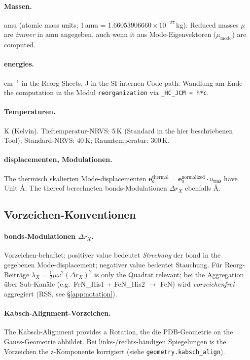 \documentclass[11pt,a4paper,twoside]{article}
\providecommand{\angstrom}{\text{\AA}}    %
\theoremstyle{remark}
\begin{document}
\paragraph{Massen.}
amu (atomic mass units; 1\,amu = $1.66053906660 \times 10^{-27}$\,kg).
Reduced masses $\mu$ are \emph{immer} in amu angegeben, auch
wenn it aus Mode-Eigenvektoren ($\mu_\text{mode}$) are computed.

\paragraph{energies.}
cm$^{-1}$ in the Reorg-Sheets, J in the SI-internen Code-path. Wandlung
am Ende the computation in the Modul \texttt{reorganization} via
\verb|_HC_JCM = h*c|.

\paragraph{Temperaturen.}
K (Kelvin). Tieftemperatur-NRVS: 5\,K (Standard in the hier
beschriebenen Tool); Standard-NRVS: 40\,K; Raumtemperatur: 300\,K.

\paragraph{displacementen, Modulationen.}
The thermisch skalierten Mode-displacementen
$\mathbf{e}_a^\text{thermal} = \mathbf{e}_a^\text{normalized} \cdot
u_\text{rms}$ have Unit $\angstrom$. The thereof berechneten
bonds-Modulationen $\Delta r_X$ ebenfalls $\angstrom$.

\subsection{Vorzeichen-Konventionen}

\paragraph{bonds-Modulationen $\Delta r_X$.}
Vorzeichen-behaftet: positiver value bedeutet \emph{Streckung} der
bond in the gegebenen Mode-displacement; negativer value bedeutet
Stauchung. F\"ur Reorg-Beitr\"age $\lambda_X = \tfrac{1}{2}\mu\omega^2
(\Delta r_X)^2$ is only the Quadrat relevant; bei the Aggregation
\"uber Sub-Kan\"ale (e.g.\ FeN\_His1 + FeN\_His2 $\to$ FeN) wird
\emph{vorzeichenfrei} aggregiert (RSS, see \S\ref{app:notation}).

\paragraph{Kabsch-Alignment-Vorzeichen.}
The Kabsch-Alignment provides a Rotation, the die PDB-Geometrie
on the Gauss-Geometrie abbildet. Bei links-/rechts-h\"andigen
Spiegelungen is the Vorzeichen the z-Komponente korrigiert
(siehe \texttt{geometry.kabsch\_align}).
\end{document}
